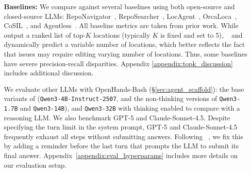 \textbf{Baselines:} We compare \methodname against several baselines using both open-source and closed-source LLMs: RepoNavigator~\citep{zhang2025one}, RepoSearcher~\citep{ma2025toolintegratedreinforcementlearningrepo}, LocAgent~\citep{chen-etal-2025-locagent}, OrcaLoca~\citep{yu2025orcalocallmagentframework}, CoSIL~\citep{jiang2025issuelocalizationllmdriveniterative}, and Agentless~\citep{xia2024agentless}. All baseline metrics are taken from prior work. While ~\citet{ma2025toolintegratedreinforcementlearningrepo,jiang2025issuelocalizationllmdriveniterative,chen-etal-2025-locagent,xia2024agentless} output a ranked list of top-$K$ locations (typically $K$ is fixed and set to 5), ~\citet{zhang2025one, yu2025orcalocallmagentframework} and \methodname dynamically predict a variable number of locations, which better reflects the fact that issues may require editing varying number of locations. Thus, some baselines have severe precision-recall disparities. Appendix \ref{appendix:topk_discussion} includes additional discussion.

We evaluate other LLMs with OpenHands-Bash (\S\ref{sec:agent_scaffold}): the base variants of \methodname (\texttt{Qwen3-4B-Instruct-2507}, and the non-thinking versions of \texttt{Qwen3-1.7B} and \texttt{Qwen3-14B}), and \texttt{Qwen3-32B} with thinking enabled to compare with a reasoning LLM. We also benchmark GPT-5 and Claude-Sonnet-4.5. Despite specifying the turn limit in the system prompt, GPT-5 and Claude-Sonnet-4.5 frequently exhaust all steps without submitting answers. Following ~\citet{zhang2025one}, we fix this by adding a reminder before the last turn that prompts the LLM to submit its final answer. Appendix~\ref{appendix:eval_hyperparams} includes more details on our evaluation setup.